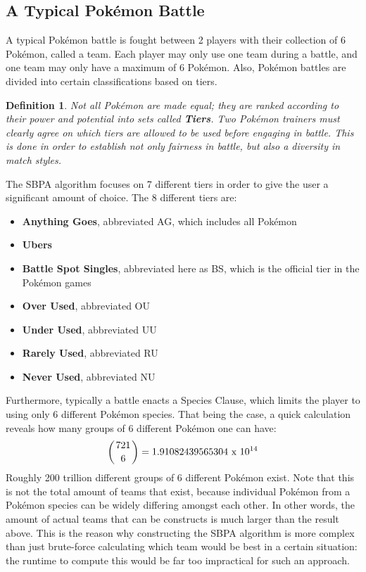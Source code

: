 \documentclass{article}
\newtheorem{definition}{Definition}
\begin{document}
\subsection{A Typical Pok\'emon Battle}
A typical Pok\'emon battle is fought between 2 players with their collection of 6 Pok\'emon, called a team. Each player may only use one team during a battle, and one team may only have a maximum of 6 Pok\'emon. Also, Pok\'emon battles are divided into certain classifications based on tiers.
\begin{definition}\label{tierdef}
	Not all Pok\'emon are made equal; they are ranked according to their power and potential into sets called \textbf{Tiers}. Two Pok\'emon trainers must clearly agree on which tiers are allowed to be used before engaging in battle. This is done in order to establish not only fairness in battle, but also a diversity in match styles.
\end{definition} 
The SBPA algorithm focuses on 7 different tiers in order to give the user a significant amount of choice. The 8 different tiers are:
\begin{itemize}
	\item \textbf{Anything Goes}, abbreviated AG, which includes all Pok\'emon
	\item \textbf{Ubers}
	\item \textbf{Battle Spot Singles}, abbreviated here as BS, which is the official tier in the Pok\'emon games
	\item \textbf{Over Used}, abbreviated OU
	\item \textbf{Under Used}, abbreviated UU
	\item \textbf{Rarely Used}, abbreviated RU
	\item \textbf{Never Used}, abbreviated NU
\end{itemize}
Furthermore, typically a battle enacts a Species Clause, which limits the player to using only 6 different Pok\'emon species. That being the case, a quick calculation reveals how many groups of 6 different Pok\'emon one can have:
\begin{equation*}
\left({721 \above 0pt 6}\right)=1.91082439565304\text{ x }10^{14}
\end{equation*}
Roughly 200 trillion different groups of 6 different Pok\'emon exist. Note that this is not the total amount of teams that exist, because individual Pok\'emon from a Pok\'emon species can be widely differing amongst each other. In other words, the amount of actual teams that can be constructs is much larger than the result above. This is the reason why constructing the SBPA algorithm is more complex than just brute-force calculating which team would be best in a certain situation: the runtime to compute this would be far too impractical for such an approach.\\\\
\end{document}
